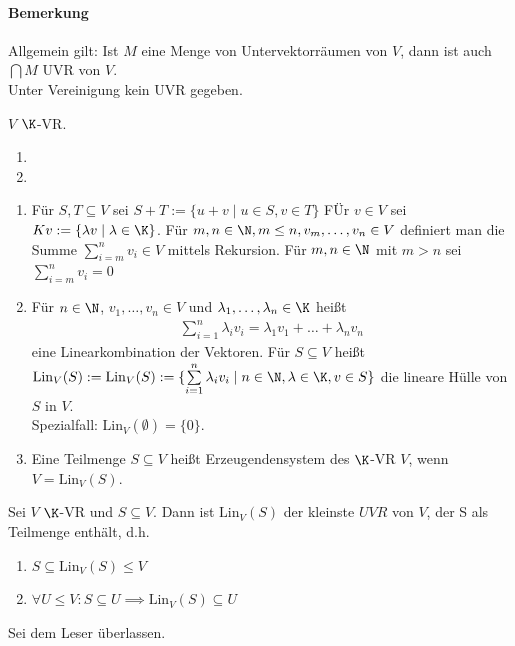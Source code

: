 \paragraph{Bemerkung} Allgemein gilt: Ist $M$ eine Menge von Untervektorräumen von $V$, dann ist auch $\bigcap M$ UVR von $V$.\\
Unter Vereinigung kein UVR gegeben.
\begin{definition}
	$V$ $\K$-VR.
\begin{enumerate}
	\item 
	\item 
\end{enumerate}
	\begin{enumerate}
		\item Für $S, T\subseteq V$ sei $S+T:=\{u+v\mid u\in S, v\in T\}$ FÜr $v\in V$ sei $Kv:=\{\lambda v\mid \lambda \in \K\}$. Für $m, n\in \N, m\leq n, v_m , \dots , v_n \in V$ definiert man die Summe $\sum\limits_{i=m}^n v_i \in V$ mittels Rekursion. Für $m, n \in \N$ mit $m>n$ sei $\sum\limits_{i=m}^n v_i=0$
		\item Für $n\in\N$, $v_1,\dots,v_n\in V$ und $\lambda_1,\dots,\lambda_n\in\K$ heißt
		\begin{align*}
			\sum\limits_{i=1}^n \lambda_iv_i= \lambda_1v_1+\dots+\lambda_nv_n
		\end{align*}
		eine Linearkombination der Vektoren. Für $S\subseteq V$ heißt $\mathrm{Lin}_V(S):=\mathrm{Lin}_V(S):=\{\sum\limits_{i=1}^n\lambda_iv_i\mid n \in \N, \lambda \in \K, v\in S\}$ die lineare Hülle von $S$ in $V$.\\ Spezialfall: $\mathrm{Lin}_V(\emptyset)=\{0\}$.
		\item Eine Teilmenge $S \subseteq V$ heißt Erzeugendensystem des $\K$-VR $V$, wenn $V=\mathrm{Lin}_V(S)$.
	\end{enumerate}
\end{definition}
\begin{theorem}
	Sei $V$ $\K$-VR und $S\subseteq V$. Dann ist $\mathrm{Lin}_V(S)$ der kleinste $UVR$ von $V$, der S als Teilmenge enthält, d.h. 
	\begin{enumerate}
		\item $S\subseteq \mathrm{Lin}_V(S)\leq V$
		\item $\forall U \leq V: S \subseteq U \implies \mathrm{Lin}_V(S) \subseteq U$
	\end{enumerate}
\end{theorem}
\prove Sei dem Leser überlassen.
